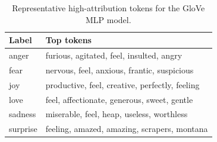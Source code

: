 \begin{table}
\caption{Representative high-attribution tokens for the GloVe MLP model.}
\label{tab:glove-token-attribution}
\begin{tabular}{ll}
\toprule
Label & Top tokens \\
\midrule
anger & furious, agitated, feel, insulted, angry \\
fear & nervous, feel, anxious, frantic, suspicious \\
joy & productive, feel, creative, perfectly, feeling \\
love & feel, affectionate, generous, sweet, gentle \\
sadness & miserable, feel, heap, useless, worthless \\
surprise & feeling, amazed, amazing, scrapers, montana \\
\bottomrule
\end{tabular}
\end{table}
